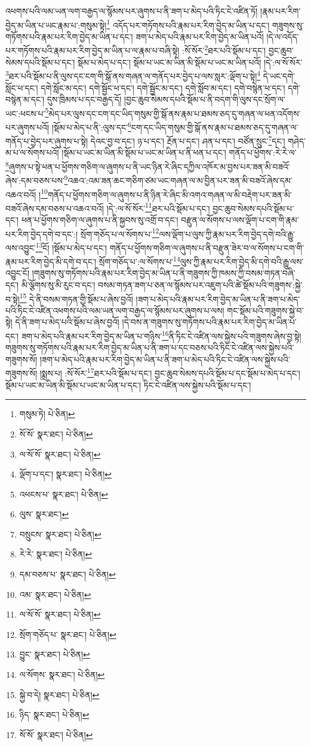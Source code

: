 འཕགས་པའི་ལམ་ཡན་ལག་བརྒྱད་ལ་སྙོམས་པར་ཞུགས་པ་ནི་ཟག་པ་མེད་པའི་ཏིང་ངེ་འཛིན་ཏོ། །རྣམ་པར་རིག་བྱེད་མ་ཡིན་པ་ཡང་རྣམ་པ་:གསུམ་སྟེ།\footnote{གསུམ་ཏེ།  པེ་ཅིན། } འདོད་པར་གཏོགས་པའི་རྣམ་པར་རིག་བྱེད་མ་ཡིན་པ་དང་། གཟུགས་སུ་གཏོགས་པའི་རྣམ་པར་རིག་བྱེད་མ་ཡིན་པ་དང་། ཟག་པ་མེད་པའི་རྣམ་པར་རིག་བྱེད་མ་ཡིན་པའོ། །དེ་ལ་འདོད་པར་གཏོགས་པའི་རྣམ་པར་རིག་བྱེད་མ་ཡིན་པ་ལ་རྣམ་པ་བཞི་སྟེ། :སོ་སོར་\footnote{སོ་སོ་  སྣར་ཐང་།  པེ་ཅིན། }ཐར་པའི་སྡོམ་པ་དང་། བྱང་ཆུབ་སེམས་དཔའི་སྡོམ་པ་དང་། སྡོམ་པ་མེད་པ་དང་། སྡོམ་པ་ཡང་མ་ཡིན་མི་སྡོམ་པ་ཡང་མ་ཡིན་པའོ། །དེ་:ལ་སོ་སོར་\footnote{ལ་སོ་སོ་  སྣར་ཐང་།  པེ་ཅིན། }ཐར་པའི་སྡོམ་པ་ནི་ལུས་དང་ངག་གི་སྒོ་ནས་གཞན་ལ་གནོད་པར་བྱེད་པ་ལས་སླར་:ལྡོག་པ་སྟེ།\footnote{ལྡོག་པ་དང་།  སྣར་ཐང་།  པེ་ཅིན། } དེ་ཡང་དགེ་སློང་ཕ་དང་། དགེ་སློང་མ་དང་། དགེ་སྦྱོང་ཕ་དང་། དགེ་སྦྱོང་མ་དང་། དགེ་སློབ་མ་དང་། དགེ་བསྙེན་ཕ་དང་། དགེ་བསྙེན་མ་དང་། དུས་ཁྲིམས་པ་དང་བརྒྱད་དོ། །བྱང་ཆུབ་སེམས་དཔའི་སྡོམ་པ་ནི་བདག་གི་ལུས་དང་སྲོག་ལ་ཡང་:ཕངས་པ་\footnote{འཕངས་པ་  སྣར་ཐང་།  པེ་ཅིན། }མེད་པར་ལུས་དང་ངག་དང་ཡིད་གསུམ་གྱི་སྒོ་ནས་རྣམ་པ་ཐམས་ཅད་དུ་གཞན་ལ་ཕན་འདོགས་པར་ཞུགས་པའོ། །སྡོམ་པ་མེད་པ་ནི་:ལུས་དང་\footnote{ལུས་  སྣར་ཐང་། }ངག་དང་ཡིད་གསུམ་གྱི་སྒོ་ནས་རྣམ་པ་ཐམས་ཅད་དུ་གཞན་ལ་གནོད་པ་བྱེད་པར་ཞུགས་པ་སྟེ། དེའང་བྱ་བ་དང་། ཉ་པ་དང་། རྔོན་པ་དང་། ཤན་པ་དང་། བཙོན་སྲུང་\footnote{བསྲུངས་  སྣར་ཐང་།  པེ་ཅིན། }དང་། གཤེད་མ་པ་ལ་སོགས་པའོ། །སྡོམ་པ་ཡང་མ་ཡིན་མི་སྡོམ་པ་ཡང་མ་ཡིན་པ་ནི་ཕན་པ་དང་། གནོད་པ་ཕྱོགས་:རེ་རེ་ལ་\footnote{རེ་རེ་  སྣར་ཐང་།  པེ་ཅིན། }ཞུགས་པ་སྟེ་ཕན་པ་ཕྱོགས་གཅིག་ལ་ཞུགས་པ་ནི་ཡང་ཉིན་རེ་ཞིང་དཀྱིལ་འཁོར་མ་བྱས་པར་ཟན་མི་བཟའོ་ཞེས་:དམ་བཅས་པས་\footnote{དམ་བཅས་པ་  སྣར་ཐང་།  པེ་ཅིན། }འཆའ་:འམ་ཟན་ཆང་གཅིག་ཙམ་ཡང་གཞན་ལ་མ་བྱིན་པར་ཟན་མི་བཟའོ་ཞེས་དམ་འཆའ་བའོ། །\footnote{འམ་  སྣར་ཐང་།  པེ་ཅིན། }གནོད་པ་ཕྱོགས་གཅིག་ལ་ཞུགས་པ་ནི་ཉིན་རེ་ཞིང་མི་འགའ་གཞན་ལ་མི་བརྡེག་པར་ཟན་མི་བཟའོ་ཞེས་དམ་བཅས་པ་འཆའ་བའོ། །དེ་:ལ་སོ་སོར་\footnote{ལ་སོ་སོ་  སྣར་ཐང་།  པེ་ཅིན། }ཐར་པའི་སྡོམ་པ་དང་། བྱང་ཆུབ་སེམས་དཔའི་སྡོམ་པ་དང་། ཕན་པ་ཕྱོགས་གཅིག་ལ་ཞུགས་པ་ནི་སྐྱབས་སུ་འགྲོ་བ་དང་། བརྫུན་ལ་སོགས་པ་ལས་ལྡོག་པ་ངག་གི་རྣམ་པར་རིག་བྱེད་དགེ་བ་དང་:། སྲོག་གཅོད་པ་ལ་སོགས་པ་\footnote{སྲོག་གཅོད་པ་  སྣར་ཐང་།  པེ་ཅིན། }ལས་ལྡོག་པ་ལུས་ཀྱི་རྣམ་པར་རིག་བྱེད་དགེ་བའི་རྒྱུ་ལས་འབྱུང་\footnote{བྱུང་  སྣར་ཐང་།  པེ་ཅིན། }ངོ། །སྡོམ་པ་མེད་པ་དང་། གནོད་པ་ཕྱོགས་གཅིག་ལ་ཞུགས་པ་ནི་བརྫུན་ཟེར་བ་ལ་སོགས་པ་ངག་གི་རྣམ་པར་རིག་བྱེད་མི་དགེ་བ་དང་། སྲོག་གཅོད་པ་:ལ་སོགས་པ་\footnote{ལ་སོགས་  སྣར་ཐང་།  པེ་ཅིན། }ལུས་ཀྱི་རྣམ་པར་རིག་བྱེད་མི་དགེ་བའི་རྒྱུ་ལས་འབྱུང་ངོ། །གཟུགས་སུ་གཏོགས་པའི་རྣམ་པར་རིག་བྱེད་མ་ཡིན་པ་ནི་གཟུགས་ཀྱི་ཁམས་ཀྱི་བསམ་གཏན་བཞི་དང་། མི་ལྕོགས་སུ་མི་རུང་བ་དང་། བསམ་གཏན་ཟག་པ་ཅན་ལ་སྙོམས་པར་འཇུག་པའི་ཚེ་སྡོམ་པའི་གཟུགས་:སྐྱེ་བ་སྟེ།\footnote{སྐྱེ་བ་དེ།  སྣར་ཐང་།  པེ་ཅིན། } དེ་ནི་བསམ་གཏན་གྱི་སྡོམ་པ་ཞེས་བྱའོ། །ཟག་པ་མེད་པའི་རྣམ་པར་རིག་བྱེད་མ་ཡིན་པ་ནི་ཟག་པ་མེད་པའི་ཏིང་ངེ་འཛིན་འཕགས་པའི་ལམ་ཡན་ལག་བརྒྱད་ལ་སྙོམས་པར་ཞུགས་པ་ལས། གང་སྡོམ་པའི་གཟུགས་སྐྱེ་བ་སྟེ། དེ་ནི་ཟག་པ་མེད་པའི་སྡོམ་པ་ཞེས་བྱའོ། །དེ་བས་ན་གཟུགས་སུ་གཏོགས་པའི་རྣམ་པར་རིག་བྱེད་མ་ཡིན་པ་དང་། ཟག་པ་མེད་པའི་རྣམ་པར་རིག་བྱེད་མ་ཡིན་པ་གཉིས་\footnote{ཉིད་  སྣར་ཐང་།  པེ་ཅིན། }ནི་ཏིང་ངེ་འཛིན་ལས་སྐྱེས་པའི་གཟུགས་ཞེས་བྱ་སྟེ། གཟུགས་སུ་གཏོགས་པའི་རྣམ་པར་རིག་བྱེད་མ་ཡིན་པ་ནི་ཟག་པ་དང་བཅས་པའི་ཏིང་ངེ་འཛིན་ལས་སྐྱེས་པའི་གཟུགས་སོ། །ཟག་པ་མེད་པའི་རྣམ་པར་རིག་བྱེད་མ་ཡིན་པ་ནི་ཟག་པ་མེད་པའི་ཏིང་ངེ་འཛིན་ལས་སྐྱེས་པའི་གཟུགས་སོ། །སྨྲས་པ། :སོ་སོར་\footnote{སོ་སོ་  སྣར་ཐང་།  པེ་ཅིན། }ཐར་པའི་སྡོམ་པ་དང་། བྱང་ཆུབ་སེམས་དཔའི་སྡོམ་པ་དང་སྡོམ་པ་མེད་པ་དང་། སྡོམ་པ་ཡང་མ་ཡིན་མི་སྡོམ་པ་ཡང་མ་ཡིན་པ་དང་། ཏིང་ངེ་འཛིན་ལས་སྐྱེས་པའི་སྡོམ་པ་དང་། 